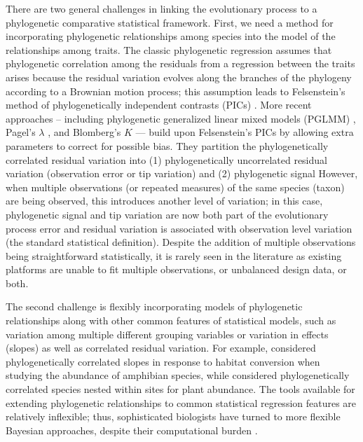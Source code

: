 There are two general challenges in linking the evolutionary process to a phylogenetic comparative statistical framework.
First, we need a method for incorporating phylogenetic relationships among species into the model of the relationships among traits.
The classic phylogenetic regression assumes that phylogenetic correlation among the residuals from a regression between the traits arises because the residual variation evolves along the branches of the phylogeny according to a Brownian motion process; this assumption leads to Felsenstein's method of phylogenetically independent contrasts (PICs) \citep{felsenstein1985phylogenies}.
More recent approaches -- including phylogenetic generalized linear mixed models (PGLMM) \citep{ives2011generalized}, Pagel's $\lambda$ \citep{pagel1999inferring}, and Blomberg's $K$ \citep{blomberg2003testing} --- build upon Felsenstein's PICs by allowing extra parameters to correct for possible bias. They partition the phylogenetically correlated residual variation into (1) phylogenetically uncorrelated residual variation (observation error or tip variation) and (2) phylogenetic signal  \citep[biological/evolutionary process error:][]{hansen2012interpreting} 
However, when multiple observations (or repeated measures) of the same species (taxon) are being observed, this introduces another level of variation; in this case, phylogenetic signal and tip variation are now both part of the evolutionary process error and residual variation is associated with observation level variation (the standard statistical definition). 
Despite the addition of multiple observations being straightforward statistically, it is rarely seen in the literature as existing platforms are unable to fit multiple observations, or unbalanced design data, or both.

The second challenge is flexibly incorporating models of phylogenetic relationships along with other common features of statistical models, such as variation among multiple different grouping variables or variation in effects (slopes) as well as correlated residual variation.
For example, \cite{nowakowski2018phylogenetic} considered phylogenetically correlated slopes in response to habitat conversion when studying the abundance of amphibian species, while \cite{li2017canfun} considered phylogenetically correlated species nested within sites for plant abundance. 
The tools available for extending phylogenetic relationships to common statistical regression features are relatively inflexible; thus, sophisticated biologists have turned to more flexible Bayesian approaches, despite their computational burden \cite{hadfield2010mcmc, burkner2016brms}.

